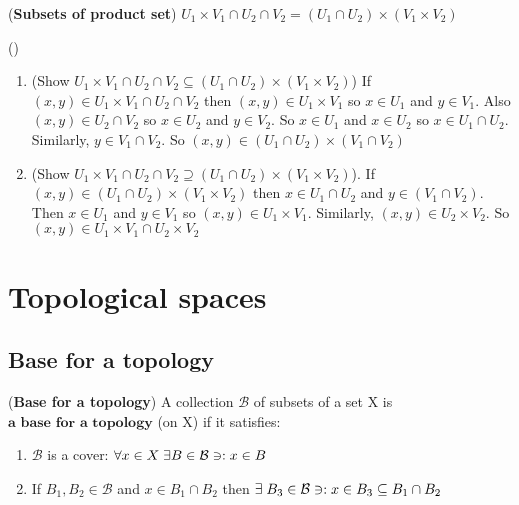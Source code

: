\documentclass[11pt]{amsart}
\begin{document}
\begin{note}{(\textbf{Subsets of product set})}
$U_1 \times V_1 \cap U_2 \cap V_2 = (U_1 \cap U_2) \times (V_1 \times V_2)$
\begin{verify} () 
\begin{enumerate}
\item (Show $U_1 \times V_1 \cap U_2 \cap V_2 \subseteq (U_1 \cap U_2) \times (V_1 \times V_2)$)
If $(x,y) \in U_1 \times V_1 \cap U_2 \cap V_2 $ then $(x,y) \in U_1 \times V_1$ so $x \in U_1$ and $y \in V_1$.
Also $(x,y) \in  U_2 \cap V_2$ so $x \in U_2$ and $y \in V_2$. So $x \in U_1$ and $x \in U_2$ so $x \in U_1 \cap U_2$. Similarly, $y \in V_1 \cap V_2$. So $(x,y) \in (U_1 \cap U_2) \times (V_1 \cap V_2)$ 
\item (Show $U_1 \times V_1 \cap U_2 \cap V_2 \supseteq (U_1 \cap U_2) \times (V_1 \times V_2)$).
If $(x,y) \in (U_1 \cap U_2) \times (V_1 \times V_2)$ then $x \in U_1 \cap U_2$ and $y \in (V_1 \cap V_2)$. Then $x \in U_1$ and $y \in V_1$ so $(x,y) \in U_1 \times V_1$. Similarly,  $(x,y) \in U_2 \times V_2$. So $(x,y) \in U_1 \times V_1 \cap  U_2 \times V_2$
\end{enumerate}
\end{verify}
\end{note}


\section{Topological spaces}
\subsection{Base for a topology}

\begin{definition}{(\textbf{Base for a topology})} A collection $\mathcal{B}$ of subsets of a set X is $\textbf{a base for a topology}$ (on X) if it satisfies:
\begin{enumerate}[label=(\arabic*)]
\item $\mathcal{B}$ is a cover:  $\forall x \in X \;  \exists B \in \mathcal{B} \ni : x \in B$
\item If $B_1, B_2 \in \mathcal{B}$ and $x \in B_1 \cap B_2$ then $\exists \; B_3 \in \mathcal{B} \ni : x \in B_3 \subseteq B_1 \cap B_2$
\end{enumerate}
\end{definition}
\end{document}
